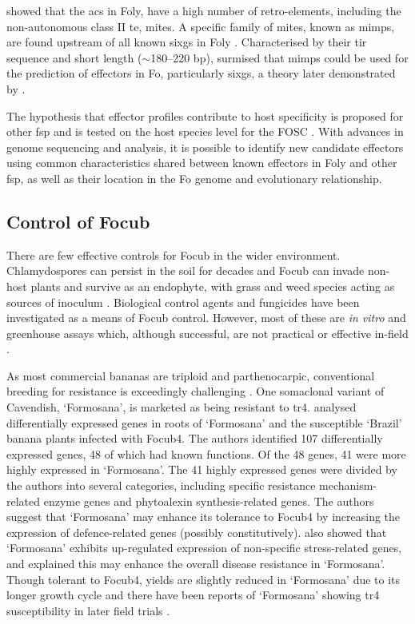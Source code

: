 \textcite{Ma2010} showed that the \acp{ac} in \ac{Foly}, have a high number of retro-elements, including the non-autonomous class II \acf{te}, \ac{mites}. A specific family of \ac{mites}, known as \acfp{mimp}, are found upstream of all known \acp{sixg} in \ac{Foly} \parencite{Schmidt2013}. Characterised by their \ac{tir} sequence and short length ($\sim$180–220 \acs{bp}), \textcite{Schmidt2013} surmised that \acp{mimp} could be used for the prediction of effectors in \ac{Fo}, particularly \acp{sixg}, a theory later demonstrated by \textcite{Dam2016, Dam2017, Armitage2018, FoEC2}.  

The hypothesis that effector profiles contribute to host specificity is proposed for other \ac{fsp} \parencite{Achari2021, Batson2021} and is tested on the host species level for the \ac{FOSC} \parencite{Dam2016}. With advances in genome sequencing and analysis, it is possible to identify new candidate effectors using common characteristics shared between known effectors in \ac{Foly} and other \ac{fsp}, as well as their location in the \ac{Fo} genome and evolutionary relationship.

\subsection{Control of \acl{Focub}}

There are few effective controls for \ac{Focub} in the wider environment. Chlamydospores can persist in the soil for decades and \ac{Focub} can invade non-host plants and survive as an endophyte, with grass and weed species acting as sources of inoculum \parencite{Pegg2019}. Biological control agents and fungicides have been investigated as a means of \ac{Focub} control. However, most of these are \textit{in vitro} and greenhouse assays which, although successful, are not practical or effective in-field \parencite{Dita2018}.  

As most commercial bananas are triploid and parthenocarpic, conventional breeding for resistance is exceedingly challenging \parencite{Dale2017}. One somaclonal variant of Cavendish, ‘Formosana’, is marketed as being resistant to \ac{tr4}. \textcite{wang2017differential} analysed differentially expressed genes in roots of ‘Formosana’ and the susceptible ‘Brazil’ banana plants infected with \ac{Focub4}. The authors identified 107 differentially expressed genes, 48 of which had known functions. Of the 48 genes, 41 were more highly expressed in ‘Formosana’. The 41 highly expressed genes were divided by the authors into several categories, including specific resistance mechanism-related enzyme genes and phytoalexin synthesis-related genes. The authors suggest that ‘Formosana’ may enhance its tolerance to \ac{Focub4} by increasing the expression of defence-related genes (possibly constitutively). \textcite{wang2017differential} also showed that ‘Formosana’ exhibits up-regulated expression of non-specific stress-related genes, and explained this may enhance the overall disease resistance in ‘Formosana’. Though tolerant to \ac{Focub4}, yields are slightly reduced in ‘Formosana’ due to its longer growth cycle and there have been reports of  ‘Formosana’ showing \ac{tr4} susceptibility in later field trials \parencite{Lee2011, Dale2017}. 

